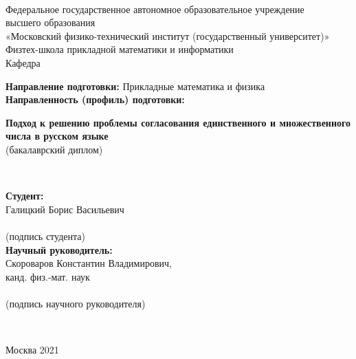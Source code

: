 \thispagestyle{empty}
\begin{singlespacing}
\begin{center}
~\\[48pt]
Федеральное государственное автономное образовательное учреждение \\
высшего образования \\
«Московский физико-технический институт {(государственный университет)}»\\
Физтех-школа прикладной математики и информатики \\
Кафедра \\[12pt]
\normalsize
\end{center}


\begin{flushleft}
\textbf{Направление подготовки:} Прикладные математика и физика\\
\textbf{Направленность (профиль) подготовки:} \\[84pt]
\normalsize
\end{flushleft}



\begin{center}
{\bf
Подход к решению проблемы согласования единственного и множественного числа в русском языке} \\
(бакалаврский диплом)\\[48pt]
\normalsize
\end{center}

\small

\begin{minipage}{0.45\textwidth}
~\\
\end{minipage}
\begin{minipage}{0.45\textwidth}
  \begin{flushleft}
  \textbf{Студент:} \\
  Галицкий Борис Васильевич\\[6pt]
  \underline{\hspace{\textwidth}}\\
  {\footnotesize {\centering (подпись студента)\\[6pt]}}
  \textbf{Научный руководитель:}\\
  Скороваров Константин Владимирович,\\ 
  канд. физ.-мат. наук\\ [6pt]
  \underline{\hspace{\textwidth}}\\
  {\footnotesize {\centering (подпись научного руководителя)\\[6pt]}}
  \end{flushleft}
\end{minipage}
\end{singlespacing}
\\[120pt]
\begin{center}
Москва 2021
\end{center}